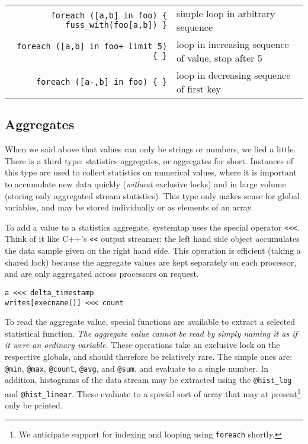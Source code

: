 \documentclass{article}
\renewcommand{\nomenclature}[2]{}
\begin{document}
\begin{tabular}{rp{}}
\verb|foreach ([a,b] in foo) { fuss_with(foo[a,b]) }| & simple loop in arbitrary sequence \\
\verb|foreach ([a,b] in foo+ limit 5) { }| & loop in increasing sequence of value, stop after 5 \\
\verb|foreach ([a-,b] in foo) { }| & loop in decreasing sequence of first key \\
\end{tabular}

\subsection{Aggregates}

When we said above that values can only be strings or numbers, we lied
a little.  There is a third type: statistics aggregates, or aggregates
for short.  Instances of this type are used to collect statistics on
numerical values, where it is important to accumulate new data quickly
({\em without} exclusive locks) and in large volume (storing only
aggregated stream statistics).  This type only makes sense for global
variables, and may be stored individually or as elements of an array.
\nomenclature{aggregate}{A special ``write-mostly'' data type used to
efficiently store aggregated statistical values of a potentially huge
data stream.}

To add a value to a statistics aggregate, systemtap uses the special
operator \verb+<<<+.  Think of it like C++'s \verb+<<+ output
streamer: the left hand side object accumulates the data sample given
on the right hand side.  This operation is efficient (taking a shared
lock) because the aggregate values are kept separately on each
processor, and are only aggregated across processors on request.

\begin{verbatim}
a <<< delta_timestamp
writes[execname()] <<< count
\end{verbatim}

To read the aggregate value, special functions are available to
extract a selected statistical function. {\em The aggregate value
cannot be read by simply naming it as if it were an ordinary
variable.}  These operations take an exclusive lock on the respective
globals, and should therefore be relatively rare.  The simple ones
are: \verb+@min+, \verb+@max+, \verb+@count+, \verb+@avg+, and
\verb+@sum+, and evaluate to a single number.  In addition, histograms
of the data stream may be extracted using the \verb+@hist_log+ and
\verb+@hist_linear+.  These evaluate to a special sort of array that
may at present\footnote{We anticipate support for indexing and looping
using {\tt foreach} shortly.} only be printed.
\nomenclature{extractor}{A function-like expression in a script that
computes a single statistic for a given aggregate.}
\end{document}
